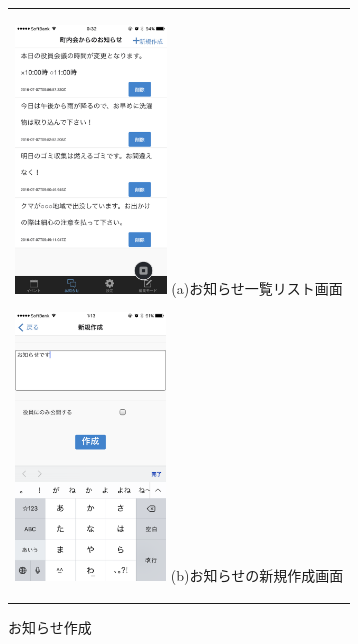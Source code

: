 \begin{figure}[htbp]
  \begin{center}
    \begin{tabular}{c}

      \begin{minipage}{0.33\hsize}
        \begin{center}
\includegraphics[width=4cm]{notification_list.PNG}
          \hspace{1cm} %
          {\footnotesize (a)お知らせ一覧リスト画面}
        \end{center}
      \end{minipage}

      \begin{minipage}{0.33\hsize}
        \begin{center}
\includegraphics[width=4cm]{notification_add.PNG}
          \hspace{1cm}%
          {\footnotesize (b)お知らせの新規作成画面}
        \end{center}
      \end{minipage}

    \end{tabular}
    \caption{お知らせ作成}
    \label{fig:lena}
  \end{center}
\end{figure}

